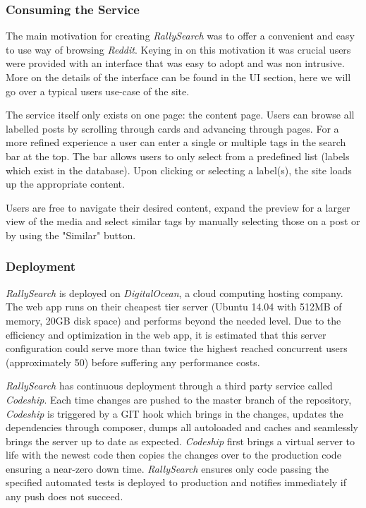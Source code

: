 \documentclass[msc,oneside]{ubcthesis}%
\begin{document}
\subsubsection{Consuming the Service}
The main motivation for creating \textit{RallySearch} was to offer a convenient and easy to use way of browsing \textit{Reddit}. Keying in on this motivation it was crucial users were provided with an interface that was easy to adopt and was non intrusive. More on the details of the interface can be found in the UI section, here we will go over a typical users use-case of the site.
\par
The service itself only exists on one page: the content page. Users can browse all labelled posts by scrolling through cards and advancing through pages. For a more refined experience a user can enter a single or multiple tags in the search bar at the top. The bar allows users to only select from a predefined list (labels which exist in the database). Upon clicking or selecting a label(s), the site loads up the appropriate content.
\par
Users are free to navigate their desired content, expand the preview for a larger view of the media and select similar tags by manually selecting those on a post or by using the "Similar" button.

\subsubsection{Deployment}
\textit{RallySearch} is deployed on \textit{DigitalOcean}, a cloud computing hosting company. The web app runs on their cheapest tier server (Ubuntu 14.04 with 512MB of memory, 20GB disk space) and performs beyond the needed level. Due to the efficiency and optimization in the web app, it is estimated that this server configuration could serve more than twice the highest reached concurrent users (approximately 50) before suffering any performance costs. 
\par
\textit{RallySearch} has continuous deployment through a third party service called \textit{Codeship}. Each time changes are pushed to the master branch of the repository, \textit{Codeship} is triggered by a GIT hook which brings in the changes, updates the dependencies through composer, dumps all autoloaded and caches and seamlessly brings the server up to date as expected. \textit{Codeship} first brings a virtual server to life with the newest code then copies the changes over to the production code ensuring a near-zero down time. \textit{RallySearch} ensures only code passing the specified automated tests is deployed to production and notifies immediately if any push does not succeed.
\end{document}
